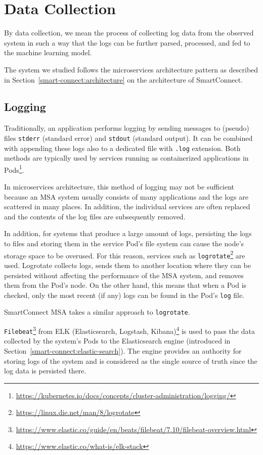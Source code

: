 \section{Data Collection}
\label{data_collection}
By data collection, we mean the process of collecting log data from the observed system in such a way that the logs can be further parsed, processed, and fed to the machine learning model.

The system we studied follows the microservices architecture pattern as described in Section~\ref{smart-connect:architecture} on the architecture of SmartConnect.\\

\subsection{Logging}

Traditionally, an application performs logging by sending messages to
(pseudo) files \texttt{stderr} (standard error) and \texttt{stdout} (standard output). It can be combined with appending these logs also to a dedicated file with \texttt{.log} extension. Both methods are typically used by services running as containerized applications in Pods\footnote{\url{https://kubernetes.io/docs/concepts/cluster-administration/logging/}}.

In microservices architecture, this method of logging may not be sufficient because an MSA system usually consists of many applications and the logs are scattered in many places. In addition, the individual services are often replaced and the contents of the log files are subsequently removed.

In addition, for systems that produce a large amount of logs, persisting the logs to files and storing them in the service Pod's file system can cause the node's storage space to be overused. For this reason, services such as \texttt{logrotate}\footnote{\url{https://linux.die.net/man/8/logrotate}} are used. Logrotate collects logs, sends them to another location where they can be persisted without affecting the performance of the MSA system, and removes them from the Pod's node. On the other hand, this means that when a Pod is checked, only the most recent (if any) logs can be found in the Pod's \texttt{log} file.

SmartConnect MSA takes a similar approach to \texttt{logrotate}.

\texttt{Filebeat}\footnote{\url{https://www.elastic.co/guide/en/beats/filebeat/7.10/filebeat-overview.html}} from ELK (Elasticsearch, Logstash, Kibana)\footnote{\url{https://www.elastic.co/what-is/elk-stack}} is used to pass the data collected by the system's Pods to the Elasticsearch engine (introduced in Section~\ref{smart-connect:elastic-search}). 
The engine provides an authority for storing logs of the system and is considered as the single source of truth since the log data is persisted there.

